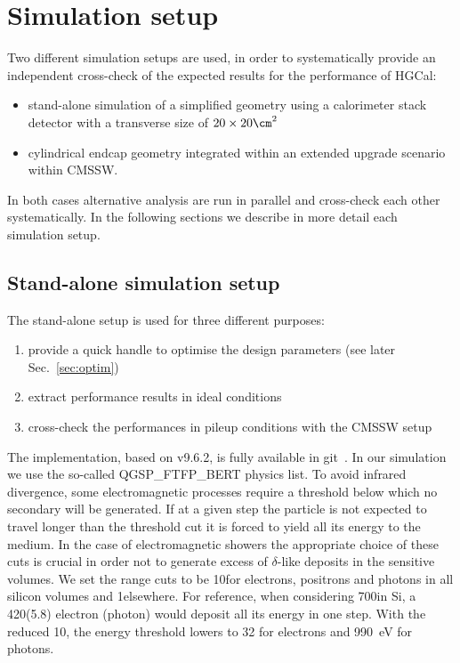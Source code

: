 %
%
%
\clearpage
\section{Simulation setup}
\label{sec:setup}

Two different simulation setups are used, in order to systematically provide an
independent cross-check of the expected results for the performance of
HGCal:

\begin{itemize}
\item stand-alone simulation of a simplified geometry using a calorimeter stack detector with a transverse size of $20 \times 20\cm^2$
\item cylindrical endcap geometry integrated within an extended upgrade scenario within CMSSW.
\end{itemize}

In both cases alternative analysis are run in parallel and cross-check
each other systematically.
In the following sections we describe in more detail each simulation setup.

\subsection{Stand-alone simulation setup}
\label{subsec:standalone}

The stand-alone setup is used for three different purposes:

\begin{enumerate}
\item provide a quick handle to optimise the design parameters (see later Sec.~\ref{sec:optim})
\item extract performance results in ideal conditions
\item cross-check the performances in pileup conditions with the CMSSW setup
\end{enumerate}

The implementation, based on  v9.6.2, is fully available in git~\cite{G4git}.
In our simulation we use the so-called QGSP\_FTFP\_BERT physics list.
To avoid infrared divergence, some electromagnetic processes require a
threshold below which no secondary will be generated.
If at a given step the particle is not expected to travel longer than
the threshold cut it is forced to yield all its energy to the medium.
In the case of electromagnetic showers the appropriate choice of these
cuts is crucial in order not to generate excess of $\delta$-like
deposits in the sensitive volumes.
We set the range cuts to be 10\mum for electrons, positrons and photons in all silicon volumes
and 1\mm elsewhere.
For reference, when considering 700\mum in Si, a 420\keV (5.8\keV) electron (photon) would deposit all its energy in
one step. With the reduced 10\mum, the energy threshold lowers to 32\keV
for electrons and 990~eV for photons.

